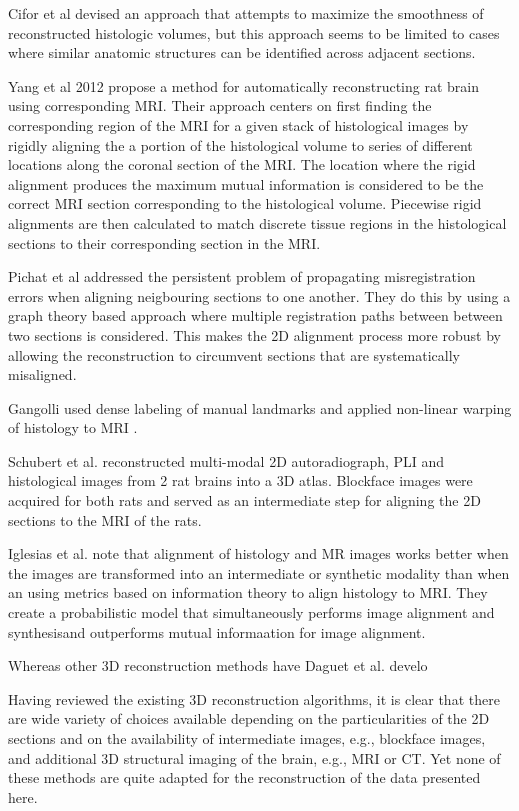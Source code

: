 \documentclass[12pt]{article}
\begin{document}
Cifor et al \cite{Cifor2011} devised an approach that attempts to maximize the smoothness of reconstructed histologic volumes, but this approach seems to be limited to cases where similar anatomic structures can be identified across adjacent sections.  


Yang et al 2012 \cite{Yang2012} propose a method for automatically reconstructing rat brain using corresponding MRI. Their approach centers on first finding the corresponding region of the MRI for a given stack of histological images by rigidly aligning the a portion of the histological volume to series of different locations along the coronal section of the MRI. The location where the rigid alignment produces the maximum mutual information is considered to be the correct MRI section corresponding to the histological volume. Piecewise rigid alignments are then calculated to match discrete tissue regions in the histological sections to their corresponding section in the MRI. 

Pichat et al \cite{Pichat2015} addressed the persistent problem of propagating misregistration errors when aligning neigbouring sections to one another. They do this by using a graph theory based approach where multiple registration paths between between two sections is considered. This makes the 2D alignment process more robust by allowing the reconstruction to circumvent sections that are systematically misaligned. 

Gangolli used dense labeling of manual landmarks and applied non-linear warping of histology to MRI \cite{Gangolli2017}.

Schubert et al. \cite{Schubert2018} reconstructed multi-modal 2D autoradiograph, PLI and histological images from 2 rat brains into a 3D atlas. Blockface images were acquired for both rats and served as an intermediate step for aligning the 2D sections to the MRI of the rats. 

Iglesias et al. \cite{Iglesias2018} note that alignment of histology and MR images works better when the images are transformed into an intermediate or synthetic modality than when an using metrics based on information theory to align histology to MRI. They create a probabilistic model that simultaneously performs image alignment and synthesisand outperforms mutual informaation for image alignment. 

Whereas other 3D reconstruction methods have Daguet et al. develo

Having reviewed the existing 3D reconstruction algorithms, it is clear that there are wide variety of choices available depending on the particularities of the 2D sections and on the availability of intermediate images, e.g., blockface images, and additional 3D structural imaging of the brain, e.g., MRI or CT. Yet none of these methods are quite adapted for the reconstruction of the data presented here.
\end{document}
